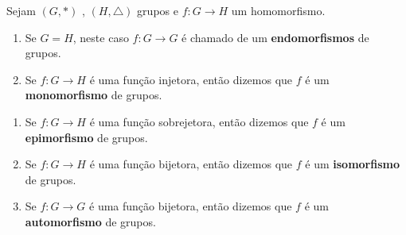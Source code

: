 \documentclass{beamer}
\begin{document}
    \begin{frame}
        \begin{observacao}
            Sejam $(G, *)$ \pause, $(H, \triangle)$ grupos \pause e $f : G \to H$ um homomorfismo. \pause

            \vspace{.5cm}

            \begin{enumerate}[label={\arabic*})]
                \item Se $G = H$, \pause neste caso $f : G \to G$ \pause é chamado de um \textbf{endomorfismos} de grupos.\pause

                \vspace{.5cm}

                \item Se $f : G \to H$ é uma função injetora, \pause então dizemos que $f$ é um \textbf{monomorfismo} de grupos.\pause

                \vspace{.5cm}

                \seti
            \end{enumerate}
        \end{observacao}
    \end{frame}

    \begin{frame}
        \begin{observacao}
            \vspace{.5cm}

            \begin{enumerate}[label={\arabic*})]
                \conti
                \item Se $f : G \to H$ é uma função sobrejetora, \pause então dizemos que $f$ é um \textbf{epimorfismo} de grupos.\pause

                \vspace{.5cm}

                \item Se $f : G \to H$ é uma função bijetora, \pause então dizemos que $f$ é um \textbf{isomorfismo} de grupos.\pause

                \vspace{.5cm}

                \item Se $f : G \to G$ é uma função bijetora, \pause então dizemos que $f$ é um \textbf{automorfismo} de grupos.

                \vspace{.5cm}

            \end{enumerate}
        \end{observacao}
    \end{frame}
\end{document}

